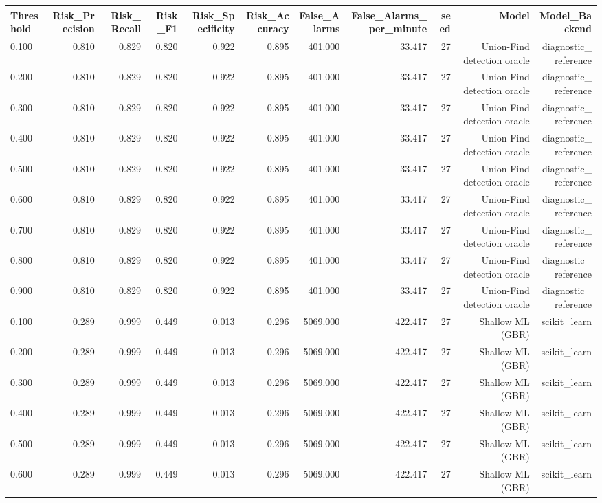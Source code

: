 \begin{tabular}{lrrrrrrrrrr}
\toprule
Threshold & Risk\_Precision & Risk\_Recall & Risk\_F1 & Risk\_Specificity & Risk\_Accuracy & False\_Alarms & False\_Alarms\_per\_minute & seed & Model & Model\_Backend \\
\midrule
0.100 & 0.810 & 0.829 & 0.820 & 0.922 & 0.895 & 401.000 & 33.417 & 27 & Union-Find detection oracle & diagnostic\_reference \\
0.200 & 0.810 & 0.829 & 0.820 & 0.922 & 0.895 & 401.000 & 33.417 & 27 & Union-Find detection oracle & diagnostic\_reference \\
0.300 & 0.810 & 0.829 & 0.820 & 0.922 & 0.895 & 401.000 & 33.417 & 27 & Union-Find detection oracle & diagnostic\_reference \\
0.400 & 0.810 & 0.829 & 0.820 & 0.922 & 0.895 & 401.000 & 33.417 & 27 & Union-Find detection oracle & diagnostic\_reference \\
0.500 & 0.810 & 0.829 & 0.820 & 0.922 & 0.895 & 401.000 & 33.417 & 27 & Union-Find detection oracle & diagnostic\_reference \\
0.600 & 0.810 & 0.829 & 0.820 & 0.922 & 0.895 & 401.000 & 33.417 & 27 & Union-Find detection oracle & diagnostic\_reference \\
0.700 & 0.810 & 0.829 & 0.820 & 0.922 & 0.895 & 401.000 & 33.417 & 27 & Union-Find detection oracle & diagnostic\_reference \\
0.800 & 0.810 & 0.829 & 0.820 & 0.922 & 0.895 & 401.000 & 33.417 & 27 & Union-Find detection oracle & diagnostic\_reference \\
0.900 & 0.810 & 0.829 & 0.820 & 0.922 & 0.895 & 401.000 & 33.417 & 27 & Union-Find detection oracle & diagnostic\_reference \\
0.100 & 0.289 & 0.999 & 0.449 & 0.013 & 0.296 & 5069.000 & 422.417 & 27 & Shallow ML (GBR) & scikit\_learn \\
0.200 & 0.289 & 0.999 & 0.449 & 0.013 & 0.296 & 5069.000 & 422.417 & 27 & Shallow ML (GBR) & scikit\_learn \\
0.300 & 0.289 & 0.999 & 0.449 & 0.013 & 0.296 & 5069.000 & 422.417 & 27 & Shallow ML (GBR) & scikit\_learn \\
0.400 & 0.289 & 0.999 & 0.449 & 0.013 & 0.296 & 5069.000 & 422.417 & 27 & Shallow ML (GBR) & scikit\_learn \\
0.500 & 0.289 & 0.999 & 0.449 & 0.013 & 0.296 & 5069.000 & 422.417 & 27 & Shallow ML (GBR) & scikit\_learn \\
0.600 & 0.289 & 0.999 & 0.449 & 0.013 & 0.296 & 5069.000 & 422.417 & 27 & Shallow ML (GBR) & scikit\_learn \\

\end{tabular}
